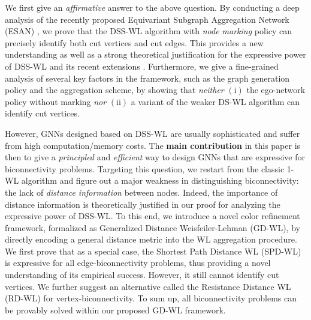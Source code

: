 \documentclass{article} %
\begin{document}

We first give an \emph{affirmative} answer to the above question. By conducting a deep analysis of the recently proposed Equivariant Subgraph Aggregation Network (ESAN) \citep{bevilacqua2022equivariant}, we prove that the DSS-WL algorithm with \emph{node marking} policy can precisely identify both cut vertices and cut edges. This provides a new understanding as well as a strong theoretical justification for the expressive power of DSS-WL and its recent extensions \citep{frasca2022Understanding}. Furthermore, we give a fine-grained analysis of several key factors in the framework, such as the graph generation policy and the aggregation scheme, by showing that \emph{neither} $(\mathrm{i})$ the ego-network policy without marking \emph{nor} $(\mathrm{ii})$ a variant of the weaker DS-WL algorithm can identify cut vertices. 


However, GNNs designed based on DSS-WL are usually sophisticated and suffer from high computation/memory costs. The \textbf{main contribution} in this paper is then to give a \emph{principled} and \emph{efficient} way to design GNNs that are expressive for biconnectivity problems.
Targeting this question, we restart from the classic 1-WL algorithm and figure out a major weakness in distinguishing biconnectivity: the lack of \emph{distance information} between nodes. Indeed, the importance of distance information is theoretically justified in our proof for analyzing the expressive power of DSS-WL. To this end, we introduce a novel color refinement framework, formalized as Generalized Distance Weisfeiler-Lehman (GD-WL), by directly encoding a general distance metric into the WL aggregation procedure. We first prove that as a special case, the Shortest Path Distance WL (SPD-WL) is expressive for all edge-biconnectivity problems, thus providing a novel understanding of its empirical success. However, it still cannot identify cut vertices. We further suggest an alternative called the Resistance Distance WL (RD-WL) for vertex-biconnectivity. To sum up, all biconnectivity problems can be provably solved within our proposed GD-WL framework.
\end{document}
